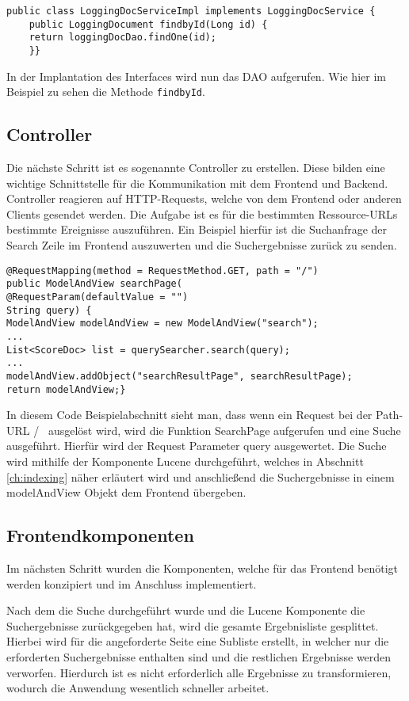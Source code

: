 \begin{lstlisting}
public class LoggingDocServiceImpl implements LoggingDocService {
	public LoggingDocument findbyId(Long id) {
	return loggingDocDao.findOne(id);
	}}
\end{lstlisting}

In der Implantation des Interfaces wird nun das DAO aufgerufen.
Wie hier im Beispiel zu sehen die Methode \texttt{findbyId}.

\subsection{Controller}
Die nächste Schritt ist es sogenannte Controller zu erstellen.
Diese bilden eine wichtige Schnittstelle für die Kommunikation mit dem Frontend und Backend.
Controller reagieren auf HTTP-Requests, welche von dem Frontend oder anderen Clients gesendet werden.
Die Aufgabe ist es für die bestimmten Ressource-URLs bestimmte Ereignisse auszuführen.
Ein Beispiel hierfür ist die Suchanfrage der Search Zeile im Frontend auszuwerten und die Suchergebnisse zurück zu senden.
\begin{lstlisting}
@RequestMapping(method = RequestMethod.GET, path = "/")
public ModelAndView searchPage(
@RequestParam(defaultValue = "")
String query) {
ModelAndView modelAndView = new ModelAndView("search");
...
List<ScoreDoc> list = querySearcher.search(query);
...
modelAndView.addObject("searchResultPage", searchResultPage);
return modelAndView;}
\end{lstlisting}

In diesem Code Beispielabschnitt sieht man, dass wenn ein Request bei der Path-URL \glqq/\grqq~ ausgelöst wird, wird die Funktion SearchPage aufgerufen und eine Suche ausgeführt.
Hierfür wird der Request Parameter query ausgewertet.
Die Suche wird mithilfe der Komponente Lucene durchgeführt, welches in Abschnitt \ref{ch:indexing} näher erläutert wird und anschließend die Suchergebnisse in einem modelAndView Objekt dem Frontend übergeben. 

\subsection{Frontendkomponenten}
Im nächsten Schritt wurden die Komponenten, welche für das Frontend benötigt werden konzipiert und im Anschluss implementiert. 

Nach dem die Suche durchgeführt wurde und die Lucene Komponente die Suchergebnisse zurückgegeben hat, wird die gesamte Ergebnisliste gesplittet.
Hierbei wird für die angeforderte Seite eine Subliste erstellt, in welcher nur die erforderten Suchergebnisse enthalten sind und die restlichen Ergebnisse werden verworfen.
Hierdurch ist es nicht erforderlich alle Ergebnisse zu transformieren, wodurch die Anwendung wesentlich schneller arbeitet.

